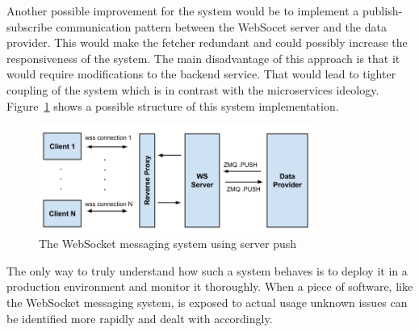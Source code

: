 \noindent
Another possible improvement for the system would be to implement a publish-subscribe communication pattern between the WebSocet server and the data provider. This would make the fetcher redundant and could possibly increase the responsiveness of the system. The main disadvantage of this approach is that it would require modifications to the backend service. That would lead to tighter coupling of the system which is in contrast with the microservices ideology. Figure~\ref{fig:websocketMessagingSystemServerPush} shows a possible structure of this system implementation.
\\
\begin{figure}[h!]
	\centering
	\includegraphics[width=0.8\textwidth]{images/websocketMessagingSystemServerPush}
	\caption{The WebSocket messaging system using server push}
	\label{fig:websocketMessagingSystemServerPush}
\end{figure}

\noindent
The only way to truly understand how such a system behaves is to deploy it in a production environment and monitor it thoroughly. When a piece of software, like the WebSocket messaging system, is exposed to actual usage unknown issues can be identified more rapidly and dealt with accordingly.

